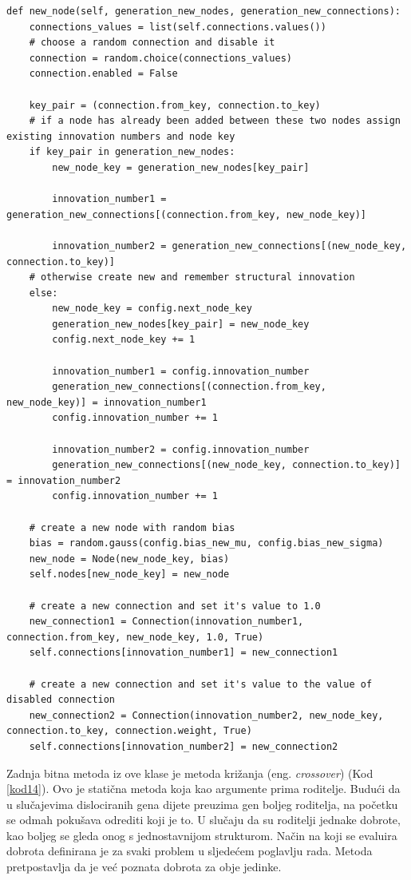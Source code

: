 \documentclass[times, utf8, diplomski, numeric]{fer}
\begin{document}
\begin{lstlisting}[frame=single, label=kod13, caption=Izvorni tekst metode \textit{new\_node} u klasi \textit{Individual}]
def new_node(self, generation_new_nodes, generation_new_connections):
	connections_values = list(self.connections.values())
	# choose a random connection and disable it
	connection = random.choice(connections_values)
	connection.enabled = False

	key_pair = (connection.from_key, connection.to_key)
	# if a node has already been added between these two nodes assign existing innovation numbers and node key
	if key_pair in generation_new_nodes:
		new_node_key = generation_new_nodes[key_pair]

		innovation_number1 = generation_new_connections[(connection.from_key, new_node_key)]

		innovation_number2 = generation_new_connections[(new_node_key, connection.to_key)]
	# otherwise create new and remember structural innovation
	else:
		new_node_key = config.next_node_key
		generation_new_nodes[key_pair] = new_node_key
		config.next_node_key += 1

		innovation_number1 = config.innovation_number
		generation_new_connections[(connection.from_key, new_node_key)] = innovation_number1
		config.innovation_number += 1

		innovation_number2 = config.innovation_number
		generation_new_connections[(new_node_key, connection.to_key)] = innovation_number2
		config.innovation_number += 1

	# create a new node with random bias
	bias = random.gauss(config.bias_new_mu, config.bias_new_sigma)
	new_node = Node(new_node_key, bias)
	self.nodes[new_node_key] = new_node

	# create a new connection and set it's value to 1.0
	new_connection1 = Connection(innovation_number1, connection.from_key, new_node_key, 1.0, True)
	self.connections[innovation_number1] = new_connection1

	# create a new connection and set it's value to the value of disabled connection
	new_connection2 = Connection(innovation_number2, new_node_key, connection.to_key, connection.weight, True)
	self.connections[innovation_number2] = new_connection2
\end{lstlisting}

Zadnja bitna metoda iz ove klase je metoda križanja (eng. \textit{crossover}) (Kod \ref{kod14}). Ovo je statična metoda koja kao argumente prima roditelje. Budući da u slučajevima dislociranih gena dijete preuzima gen boljeg roditelja, na početku se odmah pokušava odrediti koji je to. U slučaju da su roditelji jednake dobrote, kao boljeg se gleda onog s jednostavnijom strukturom. Način na koji se evaluira dobrota definirana je za svaki problem u sljedećem poglavlju rada. Metoda pretpostavlja da je već poznata dobrota za obje jedinke.
\end{document}
